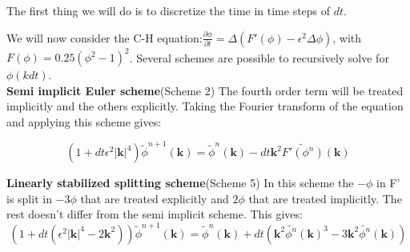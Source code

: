 \documentclass{article}
\begin{document}
The first thing we will do is to discretize the time in time steps of $dt$. 

We will now consider the C-H equation:$\frac{\partial \phi}{\partial t}=\Delta(F'(\phi)-\epsilon^2\Delta \phi)$, with $F(\phi)=0.25(\phi^2-1)^2$. Several schemes are possible to recursively solve for $\phi(kdt)$.\\

\textbf{Semi implicit Euler scheme}(Scheme 2)
The fourth order term will be treated implicitly and the others explicitly. Taking the Fourier transform of the equation and applying this scheme gives: 

$$(1+dt\epsilon^2|\textbf{k}|^4)\tilde{\phi}^{n+1}(\textbf{k})=\tilde{\phi}^n(\textbf{k})-dt\textbf{k}^2\tilde{F'(\phi^n)}(\textbf{k})$$

\textbf{Linearly stabilized splitting scheme}(Scheme 5)
In this scheme the $-\phi$ in F' is split in $-3\phi$ that are treated explicitly and $2\phi$ that are treated implicitly. The rest doesn't differ from the semi implicit scheme. This gives:
$$(1+dt(\epsilon^2|\textbf{k}|^4-2\textbf{k}^2))\tilde{\phi}^{n+1}(\textbf{k})=\tilde{\phi}^n(\textbf{k})+dt(\textbf{k}^2\tilde{{\phi^n}}(\textbf{k})^3-3\textbf{k}^2\tilde{\phi^n}(\textbf{k}))$$
\end{document}
